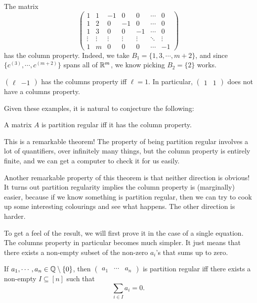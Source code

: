 \documentclass[a4paper]{article}
\begin{document}
\begin{eg}
  The matrix
  \[
    \begin{pmatrix}
      1 & 1 & -1 & 0 & 0 & \cdots & 0\\
      1 & 2 & 0 & -1 & 0 & \cdots & 0\\
      1 & 3 & 0 & 0 & -1 & \cdots & 0\\
      \vdots & \vdots & \vdots & \vdots & \vdots & \ddots & \vdots\\
      1 & m & 0 & 0 & 0 & \cdots & -1
    \end{pmatrix}
  \]
  has the column property. Indeed, we take $B_1 = \{1, 3, \cdots, m + 2\}$, and since $\{c^{(3)}, \cdots, c^{(m + 2)}\}$ spans all of $\mathbb{R}^m$, we know picking $B_2 = \{2\}$ works.
\end{eg}

\begin{eg}
  $\begin{pmatrix}\ell & -1\end{pmatrix}$ has the columns property iff $\ell = 1$. In particular, $\begin{pmatrix}1 & 1 \end{pmatrix}$ does not have a columns property.
\end{eg}

Given these examples, it is natural to conjecture the following:
\begin{thm}
  A matrix $A$ is partition regular iff it has the column property.
\end{thm}
This is a remarkable theorem! The property of being partition regular involves a lot of quantifiers, over infinitely many things, but the column property is entirely finite, and we can get a computer to check it for us easily.

Another remarkable property of this theorem is that neither direction is obvious! It turns out partition regularity implies the column property is (marginally) easier, because if we know something is partition regular, then we can try to cook up some interesting colourings and see what happens. The other direction is harder.

To get a feel of the result, we will first prove it in the case of a single equation. The columns property in particular becomes much simpler. It just means that there exists a non-empty subset of the non-zero $a_i$'s that sums up to zero.

\begin{thm}
  If $a_1,\cdots, a_n \in \mathbb{Q} \setminus \{0\}$, then $\begin{pmatrix} a_1 & \cdots & a_n \end{pmatrix}$ is partition regular iff there exists a non-empty $I \subseteq [n]$ such that
  \[
    \sum_{i \in I} a_i = 0.
  \]
\end{thm}
\end{document}
